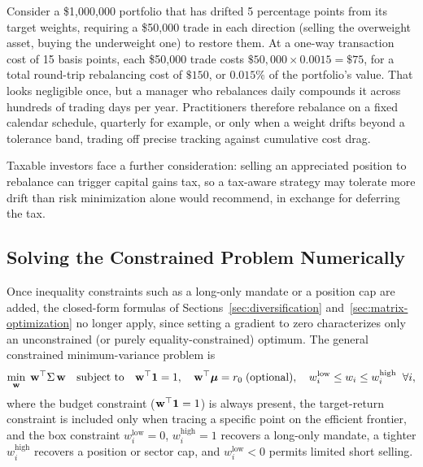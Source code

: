 \documentclass[../ai_in_finance]{subfiles}
\begin{document}
Consider a \$1,000,000 portfolio that has drifted 5 percentage points from its target weights, requiring a \$50,000 trade in each direction (selling the overweight asset, buying the underweight one) to restore them. At a one-way transaction cost of 15 basis points, each \$50,000 trade costs $\$50{,}000 \times 0.0015 = \$75$, for a total round-trip rebalancing cost of $\$150$, or $0.015\%$ of the portfolio's value. That looks negligible once, but a manager who rebalances daily compounds it across hundreds of trading days per year. Practitioners therefore rebalance on a fixed calendar schedule, quarterly for example, or only when a weight drifts beyond a tolerance band, trading off precise tracking against cumulative cost drag.

Taxable investors face a further consideration: selling an appreciated position to rebalance can trigger capital gains tax, so a tax-aware strategy may tolerate more drift than risk minimization alone would recommend, in exchange for deferring the tax.

\subsection{Solving the Constrained Problem Numerically}
\label{sec:constrained-optimization}

Once inequality constraints such as a long-only mandate or a position cap are added, the closed-form formulas of Sections~\ref{sec:diversification} and~\ref{sec:matrix-optimization} no longer apply, since setting a gradient to zero characterizes only an unconstrained (or purely equality-constrained) optimum. The general constrained minimum-variance problem is
\begin{equation*}
\min_{\bf w}\; {\bf w}^\top \Sigma\, {\bf w} \quad \text{subject to} \quad {\bf w}^\top \mathbf{1} = 1, \quad {\bf w}^\top \boldsymbol{\mu} = r_0 \;\text{(optional)}, \quad w_i^{\text{low}} \le w_i \le w_i^{\text{high}} \;\; \forall i,
\end{equation*}
where the budget constraint (${\bf w}^\top\mathbf{1}=1$) is always present, the target-return constraint is included only when tracing a specific point on the efficient frontier, and the box constraint $w_i^{\text{low}}=0$, $w_i^{\text{high}}=1$ recovers a long-only mandate, a tighter $w_i^{\text{high}}$ recovers a position or sector cap, and $w_i^{\text{low}} < 0$ permits limited short selling.
\end{document}
